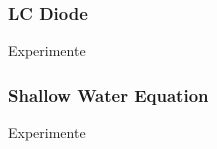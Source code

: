 \begin{frame}[<+->]
\frametitle{LC Diode}
    
    Experimente

\end{frame}

\begin{frame}[<+->]
\frametitle{Shallow Water Equation}
    
    Experimente

\end{frame}